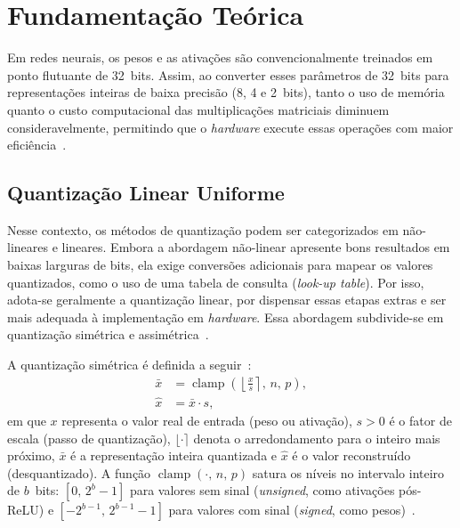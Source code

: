 \section{Fundamentação Teórica}

Em redes neurais, os pesos e as ativações são convencionalmente treinados em ponto flutuante de 32~bits. Assim, ao converter esses parâmetros de 32~bits para representações inteiras
de baixa precisão (8, 4 e 2~bits), tanto o uso de memória quanto o custo computacional das multiplicações matriciais diminuem consideravelmente, permitindo que o \textit{hardware}   
execute essas operações com maior eficiência~\cite{nagel2021}.

\subsection{Quantização Linear Uniforme}

Nesse contexto, os métodos de quantização podem ser categorizados em não-lineares e lineares. Embora a abordagem não-linear apresente bons resultados em baixas larguras de bits, ela
exige conversões adicionais para mapear os valores quantizados, como o uso de uma tabela de consulta (\textit{look-up table}). Por isso, adota-se geralmente a quantização linear, por
dispensar essas etapas extras e ser mais adequada à implementação em \textit{hardware}. Essa abordagem subdivide-se em quantização simétrica e assimétrica~\cite{lin2023}.

A quantização simétrica é definida a seguir~\cite{bhalgat2020,nagel2021}:
\begin{align}
\bar{x} &= \operatorname{clamp}\!\left(\left\lfloor \frac{x}{s} \right\rceil,\, n,\, p\right), \label{eq:quant_sim_q} \\
\hat{x} &= \bar{x} \cdot s, \label{eq:quant_sim_dq}
\end{align}
em que $x$ representa o valor real de entrada (peso ou ativação), $s > 0$ é o fator de escala (passo de quantização), $\lfloor \cdot \rceil$ denota o arredondamento para o inteiro mais próximo, $\bar{x}$ é a representação inteira quantizada e $\hat{x}$ é o valor reconstruído (desquantizado). A função $\operatorname{clamp}(\cdot,\, n,\, p)$ satura os níveis no intervalo inteiro de $b$~bits: $[0,\, 2^{b}-1]$ para valores sem sinal (\textit{unsigned}, como ativações pós-ReLU) e $[-2^{b-1},\, 2^{b-1}-1]$ para valores com sinal (\textit{signed}, como pesos)~\cite{bhalgat2020,nagel2021}.

